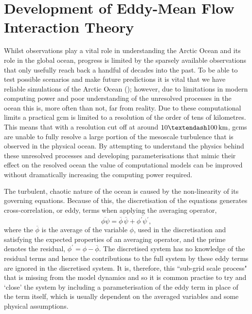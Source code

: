 \documentclass[12pt,a4paper]{report}
\newcommand*\mean[1]{\overline{#1}}
\newcommand*\res[1]{{#1}^{\prime}}
\begin{document}
\chapter{Development of Eddy-Mean Flow Interaction Theory}

\label{meaneddyinteractiontheory}

 Whilst observations play a vital role in understanding the Arctic
 Ocean and its role in the global ocean, progress is limited by the sparsely available
 observations that only usefully reach back a handful of decades into the past.
 To be able to test possible scenarios and make future predictions it is vital
 that we have reliable simulations of the Arctic Ocean (\cite{proshutinsky2008toward});
 however, due to limitations
 in modern computing power and poor understanding of the unresolved processes 
 in the ocean this is, more often than not, far from reality.
 Due to these computational limits a practical \gls{gcm} is 
 limited to a  resolution of the order of tens of kilometres. This means that with a 
 resolution  cut off at around $10 \textendash 100 \, \mathrm{km}$, 
 \glspl{gcm} are unable to fully resolve a large portion of the mesoscale turbulence that is
 observed in the physical ocean.
 By attempting  to understand the physics behind these unresolved processes 
 and developing parameterisations that mimic their effect on the resolved ocean
 the value of computational models can be improved without dramatically increasing the
 computing power required.  
 
 The turbulent, chaotic nature of the ocean is caused by the non-linearity of its 
 governing equations. Because of this,  the discretisation of the equations generates cross-correlation, or eddy, terms when applying the 
 averaging operator,
 \begin{equation}
 \mean{\phi\psi} = \mean{\phi}\,\mean{\psi} + 
 \mean{\res{\phi}\res{\psi}},
 \label{non-lin average}
 \end{equation}
 where the ${\mean{\phi}}$ is the average of the variable ${\phi}$, used in
 the discretisation and satisfying
 the expected properties of an averaging operator, and the prime denotes the residual, ${\phi^{\prime} = \phi - \mean{\phi}}$.
 The discretised system has no knowledge of the residual terms and hence
 the contributions to the full system by these eddy terms are
 ignored in the discretised system. It is, therefore, this ``sub-grid scale process"
 that is missing from the model dynamics and so it is common practise to try and
 `close' the system by including a parameterisation of the eddy
 term in place of the term itself, which is usually dependent on the averaged 
 variables and some physical assumptions.
 
\end{document}
